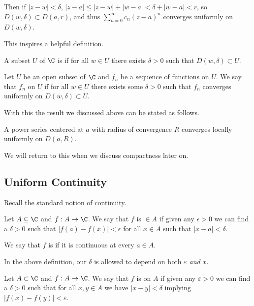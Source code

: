 Then if $|z - w| < \delta$, $|z - a| \leq |z - w| + |w - a| < \delta + |w - a| < r$, so $D(w, \delta) \subset D(a, r)$, and thus $\sum_{n =0}^{\infty} c_n (z - a)^n$ converges uniformly on $D(w, \delta)$.

This inspires a helpful definition.

\begin{definition}[Open]
    A subset $U$ of $\C$ is  if for all $w \in U$ there exists $\delta > 0$ such that $D(w, \delta) \subset U$.
\end{definition}

\begin{definition}
    Let $U$ be an open subset of $\C$ and $f_n$ be a sequence of functions on $U$. We say that $f_n$  on $U$ if for all $w \in U$ there exists some $\delta > 0$ such that $f_n$ converges uniformly on $D(w, \delta) \subset U$.  
\end{definition}

With this the result we discussed above can be stated as follows.

\begin{theorem}
    A power series centered at $a$ with radius of convergence $R$ converges locally uniformly on $D(a, R)$.
\end{theorem}

We will return to this when we discuss compactness later on.

\subsection{Uniform Continuity}

Recall the standard notion of continuity.

\begin{definition}[Continuity]
	Let $A \subseteq \C$ and $f: A \rightarrow \C$. We say that $f$ is  $\in A$ if given any $\epsilon > 0$ we can find a $\delta > 0$ such that $|f(a) - f(x)| < \epsilon$ for all $x \in A$ such that $|x -a | < \delta$.


	We say that $f$ is  if it is continuous at every $a \in A$.
\end{definition}

In the above definition, our $\delta$ is allowed to depend on both $\varepsilon$ \emph{and} $x$.

\begin{definition}
    Let $A \subset \C$ and $f: A \rightarrow \C$. We say that $f$ is  on $A$ if given any $\varepsilon > 0$ we can find a $\delta > 0$ such that for all $x, y \in A$ we have $|x - y| < \delta$ implying $|f(x) - f(y)| < \varepsilon$.
\end{definition}


